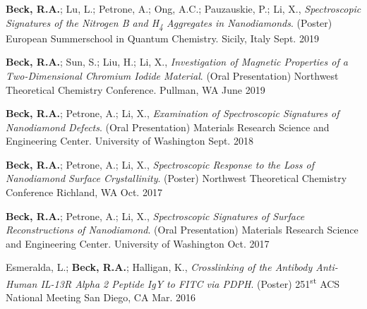 \begin{cvpresentations}
\cvpresentation %
{\textbf{Beck, R.A.}; Lu, L.; Petrone, A.; Ong, A.C.; Pauzauskie, P.; Li, X., \textit{Spectroscopic Signatures of the Nitrogen B and H\textsubscript{4} Aggregates in Nanodiamonds}. (Poster) European Summerschool in Quantum Chemistry.}
{Sicily, Italy} %
{Sept. 2019} %


\cvpresentation %
{\textbf{Beck, R.A.}; Sun, S.; Liu, H.; Li, X., \textit{Investigation of Magnetic Properties of a Two-Dimensional Chromium Iodide Material}. (Oral Presentation) Northwest Theoretical Chemistry Conference.}
{Pullman, WA} %
{June 2019} %


\cvpresentation %
{\textbf{Beck, R.A.}; Petrone, A.; Li, X., \textit{Examination of Spectroscopic Signatures of Nanodiamond Defects}. (Oral Presentation) Materials Research Science and Engineering Center.}
{University of Washington} %
{Sept. 2018} %


\cvpresentation
{\textbf{Beck, R.A.}; Petrone, A.; Li, X., \textit{Spectroscopic Response to the Loss of Nanodiamond Surface Crystallinity}. (Poster) Northwest Theoretical Chemistry Conference}
{Richland, WA} %
{Oct. 2017} %


\cvpresentation
{\textbf{Beck, R.A.}; Petrone, A.; Li, X., \textit{Spectroscopic Signatures of Surface Reconstructions of Nanodiamond}. (Oral Presentation) Materials Research Science and Engineering Center.}
{University of Washington} %
{Oct. 2017} %




\cvpresentation
{Esmeralda, L.; \textbf{Beck, R.A.}; Halligan, K., \textit{Crosslinking of the Antibody Anti-Human IL-13R Alpha 2 Peptide IgY to FITC via PDPH}. (Poster) 251\textsuperscript{st} ACS National Meeting}
{San Diego, CA} %
{Mar. 2016} %


\end{cvpresentations}

